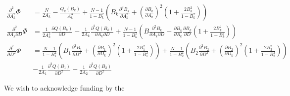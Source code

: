 \documentclass[%
 reprint,
 amsmath,amssymb,
 aps,
]{revtex4-1}
\begin{document}
\begin{equation}
	\begin{aligned}
		\frac{\partial^{2}}{\partial A_{k}^2}\Phi &= \frac{N}{2A_{k}} - \frac{Q_{k}(B_{k})}{A_{k}^{3}}
		+ \frac{N-1}{1-B_{k}^{2}}\left(B_{k}\frac{\partial^{2} B_{k}}{\partial A_{k}^{2}}
		+ \left(\frac{\partial B_{k}}{\partial A_{k}}\right)^{2}
		\left(1+\frac{2B_{k}^{2}}{1-B_{k}^{2}}\right)
		\right)\\
		\frac{\partial^{2}}{\partial A_{k}\partial D}\Phi &= \frac{1}{2A_{k}^{2}}\frac{\partial Q(B_{k})}{\partial D}
		-\frac{1}{2A_{k}}\frac{\partial^{2} Q(B_{k})}{\partial A_{k}\partial D}
		+ \frac{N-1}{1-B_{k}^{2}}\left(B\frac{\partial^{2} B_{k}}{\partial A_{k}\partial D}
		+ \frac{\partial B_{k}}{\partial A_{k}}\frac{\partial B_{k}}{\partial D}
		\left(1+\frac{2B_{k}^{2}}{1-B_{k}^{2}}\right)
		\right)\\
		\frac{\partial^{2}}{\partial D^2}\Phi &=
		\frac{N-1}{1-B_{1}^{2}}\left(B_{1}\frac{\partial^{2} B_{1}}{\partial D^{2}}
		+ \left(\frac{\partial B_{1}}{\partial D_{k}}\right)^{2}
		\left(1+\frac{2B_{1}^{2}}{1-B_{1}^{2}}\right)
		\right)
		+\frac{N-1}{1-B_{2}^{2}}\left(B_{2}\frac{\partial^{2} B_{2}}{\partial D^{2}}
		+ \left(\frac{\partial B_{2}}{\partial D_{k}}\right)^{2}
		\left(1+\frac{2B_{2}^{2}}{1-B_{2}^{2}}\right)
		\right)\\
		&- \frac{1}{2A_{1}}\frac{\partial^{2}Q(B_{1})}{\partial D^{2}}
		- \frac{1}{2A_{2}}\frac{\partial^{2}Q(B_{2})}{\partial D^{2}}
	\end{aligned}
\end{equation}
\begin{acknowledgments}
We wish to acknowledge funding by the 
\end{acknowledgments}

\end{document}
